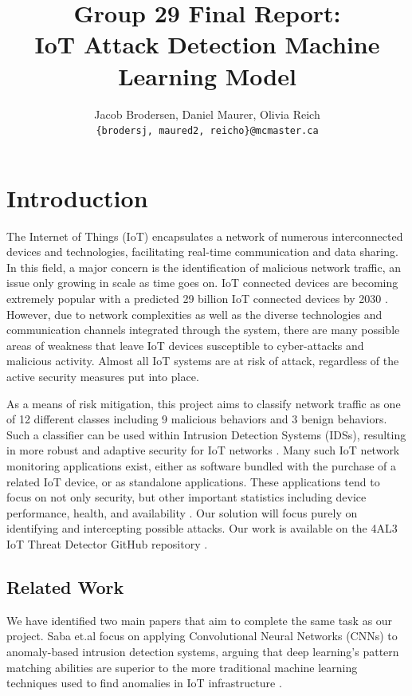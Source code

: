 \documentclass[11pt]{article}
\title{Group 29 Final Report:\\IoT Attack Detection Machine Learning Model}
\author{Jacob Brodersen, Daniel Maurer, Olivia Reich \\
  \texttt{\{brodersj, maured2, reicho\}@mcmaster.ca} }
\begin{document}
\maketitle

\section{Introduction}

The Internet of Things (IoT) encapsulates a network of numerous interconnected devices and technologies, facilitating real-time communication and data sharing. In this field, a major concern is the identification of malicious network traffic, an issue only growing in scale as time goes on. IoT connected devices are becoming extremely popular with a predicted 29 billion IoT connected devices by 2030 \citep{ref1}. However, due to network complexities as well as the diverse technologies and communication channels integrated through the system, there are many possible areas of weakness that leave IoT devices susceptible to cyber-attacks and malicious activity. Almost all IoT systems are at risk of attack, regardless of the active security measures put into place.

As a means of risk mitigation, this project aims to classify network traffic as one of 12 different classes including 9 malicious behaviors and 3 benign behaviors. Such a classifier can be used within Intrusion Detection Systems (IDSs), resulting in more robust and adaptive security for IoT networks \citep{ref2}. Many such IoT network monitoring applications exist, either as software bundled with the purchase of a related IoT device, or as standalone applications. These applications tend to focus on not only security, but other important statistics including device performance, health, and availability \citep{ref3}. Our solution will focus purely on identifying and intercepting possible attacks. Our work is available on the 4AL3 IoT Threat Detector GitHub repository \citep{ref11}.

\subsection{Related Work}

We have identified two main papers that aim to complete the same task as our project. Saba et.al focus on applying Convolutional Neural Networks (CNNs) to anomaly-based intrusion detection systems, arguing that deep learning’s pattern matching abilities are superior to the more traditional machine learning techniques used to find anomalies in IoT infrastructure \citep{ref4}. 
\end{document}
